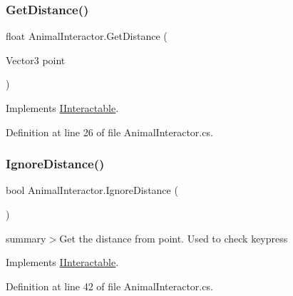 \mbox{\label{class_animal_interactor_a92693dc7d95858e69c2f787507f14acb}} 
\subsubsection{\texorpdfstring{Get\+Distance()}{GetDistance()}}
{\footnotesize\ttfamily float Animal\+Interactor.\+Get\+Distance (\begin{DoxyParamCaption}\item[{Vector3}]{point }\end{DoxyParamCaption})}



Implements \mbox{\hyperlink{interface_i_interactable_acde3047364ffe9a4ed107513feb21675}{I\+Interactable}}.



Definition at line 26 of file Animal\+Interactor.\+cs.

\mbox{\label{class_animal_interactor_a51de9b553e86019f8d45d10915fe960c}} 
\subsubsection{\texorpdfstring{Ignore\+Distance()}{IgnoreDistance()}}
{\footnotesize\ttfamily bool Animal\+Interactor.\+Ignore\+Distance (\begin{DoxyParamCaption}{ }\end{DoxyParamCaption})}



summary$>$Get the distance from point. Used to check keypress



Implements \mbox{\hyperlink{interface_i_interactable_ad184024a0cc6bce38ebcd77c0126fcc5}{I\+Interactable}}.



Definition at line 42 of file Animal\+Interactor.\+cs.

\mbox{\label{class_animal_interactor_ab7aa5df1cd2596715b1edf39752ae02f}} 
